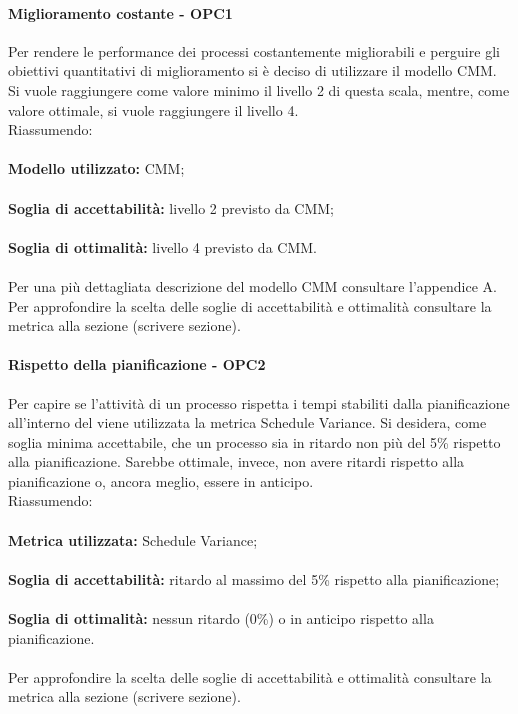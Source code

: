 \documentclass[PianoDiQualifica.tex]{subfiles}
\begin{document}
			\paragraph{Miglioramento costante - OPC1}
			Per rendere le performance dei processi costantemente migliorabili e perguire gli obiettivi quantitativi di miglioramento si è deciso di utilizzare il modello CMM.
			Si vuole raggiungere come valore minimo il livello 2 di questa scala, mentre, come valore ottimale, si vuole raggiungere il livello 4. \\
			Riassumendo: \\ \\
			\textbf{Modello utilizzato:} CMM; \\ \\
			\textbf{Soglia di accettabilità:} livello 2 previsto da CMM; \\ \\
			\textbf{Soglia di ottimalità:} livello 4 previsto da CMM. \\ \\
			Per una più dettagliata descrizione del modello CMM consultare l'appendice A. \\
			Per approfondire la scelta delle soglie di accettabilità e ottimalità consultare la metrica alla sezione (scrivere sezione).	
			
			\paragraph{Rispetto della pianificazione - OPC2}
			Per capire se l'attività di un processo rispetta i tempi stabiliti dalla pianificazione all'interno del \PPdocRR{} viene utilizzata la metrica Schedule Variance.
			Si desidera, come soglia minima accettabile, che un processo sia in ritardo non più del 5\% rispetto alla pianificazione. Sarebbe ottimale, invece, non avere ritardi
			rispetto alla pianificazione o, ancora meglio, essere in anticipo.\\
			Riassumendo: \\ \\
			\textbf{Metrica utilizzata:} Schedule Variance; \\ \\
			\textbf{Soglia di accettabilità:} ritardo al massimo del 5\% rispetto alla pianificazione; \\ \\
			\textbf{Soglia di ottimalità:} nessun ritardo (0\%) o in anticipo rispetto alla pianificazione. \\ \\
			Per approfondire la scelta delle soglie di accettabilità e ottimalità consultare la metrica alla sezione (scrivere sezione).	
			
\end{document}
